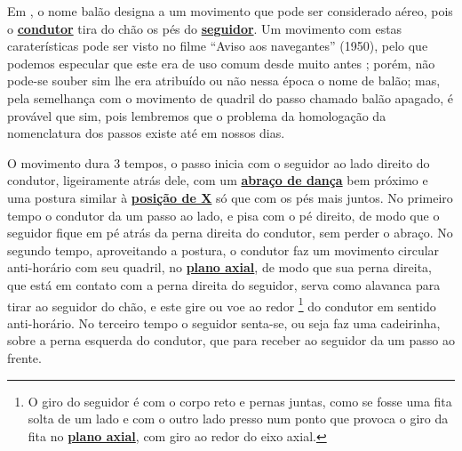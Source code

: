 Em \AnoLivro, o nome balão designa a um movimento que pode ser considerado aéreo, 
pois o \hyperref[def:Condutor]{\textbf{condutor}} tira do chão os pés do \hyperref[def:Seguidor]{\textbf{seguidor}}.
Um movimento com estas caraterísticas pode ser visto no filme ``Aviso aos navegantes'' (1950),
pelo que podemos especular que este era de uso comum desde muito antes \cite[min. 40:35]{AtlantidaDance};
porém, não pode-se souber sim lhe era atribuído ou não nessa época o nome de balão; 
mas, pela semelhança com o movimento de quadril do passo chamado balão apagado,
é provável que sim, 
pois lembremos que o problema da homologação da nomenclatura dos passos existe até em  nossos dias.



O movimento dura 3 tempos, o passo inicia com o seguidor ao lado direito do condutor, 
ligeiramente atrás dele, com um \hyperref[def:abracodedanca]{\textbf{abraço de dança}} 
bem próximo e uma postura similar à \hyperref[def:X-position]{\textbf{posição de X}} só que com os pés mais juntos.
No primeiro tempo o condutor da um passo ao lado, e pisa com o pé direito,
de modo que o seguidor fique em pé atrás da perna direita do condutor, sem perder o abraço.
No segundo tempo, aproveitando a postura, 
o condutor faz um movimento circular anti-horário com seu quadril, no \hyperref[def:PlanoAxial]{\textbf{plano axial}},
de modo que sua perna direita, que está em contato com a perna direita do seguidor,
serva como alavanca para tirar ao seguidor do chão, 
e este gire ou voe ao redor \footnote{O giro do seguidor é com o corpo reto e pernas juntas, 
como se fosse uma fita solta de um lado e com o outro lado presso num ponto 
que provoca o giro da fita no \hyperref[def:PlanoAxial]{\textbf{plano axial}}, com giro ao redor do eixo axial.} 
do condutor em sentido anti-horário.
No terceiro tempo o seguidor senta-se, ou seja faz uma cadeirinha, sobre a perna esquerda do condutor,
que para receber ao seguidor  da um passo ao frente.

